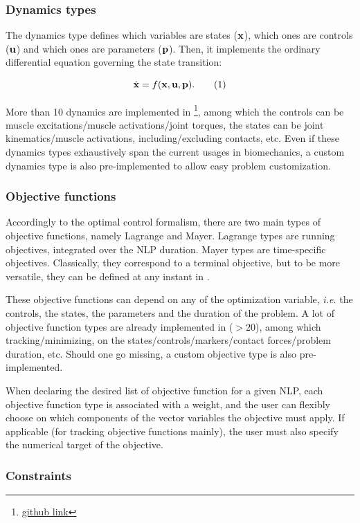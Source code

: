 \subsubsection{Dynamics types}
The dynamics type defines which variables are states ($\mathbf{x}$), which ones are controls ($\mathbf{u}$) and which ones are parameters ($\mathbf{p}$).
Then, it implements the ordinary differential equation governing the state transition:

\[
\dstate = f(\state, \control, \param).
\addtag
\label{eq:state_transition}
\]

\noindent More than 10 dynamics are implemented in \bioptim \footnote{\href{https://github.com/pyomeca/bioptim/blob/master/bioptim/dynamics/dynamics_functions.py}{github link}}, among which the controls can be muscle excitations/muscle activations/joint torques, the states can be joint kinematics/muscle activations, including/excluding contacts, etc.
Even if these dynamics types exhaustively span the current usages in biomechanics, a custom dynamics type is also pre-implemented to allow easy problem customization.

\subsubsection{Objective functions}
Accordingly to the optimal control formalism, there are two main types of objective functions, namely Lagrange and Mayer. Lagrange types are running objectives, integrated over the NLP duration. Mayer types are time-specific objectives. Classically, they correspond to a terminal objective, but to be more versatile, they can be defined at any instant in \bioptim.

These objective functions can depend on any of the optimization variable, \textit{i.e.} the controls, the states, the parameters and the duration of the problem. A lot of objective function types are already implemented in \bioptim ($>\!20$), among which tracking/minimizing, on the states/controls/markers/contact forces/problem duration, etc. Should one go missing, a custom objective type is also pre-implemented.

When declaring the desired list of objective function for a given NLP, each objective function type is associated with a weight, and the user can flexibly choose on which components of the vector variables the objective must apply. If applicable (for tracking objective functions mainly), the user must also specify the numerical target of the objective.

\subsubsection{Constraints}